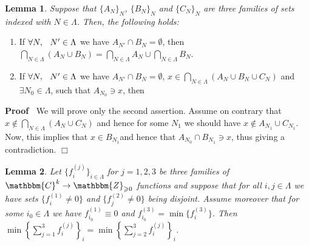 \documentclass{article}
\newcommand{\nin}{\not\in}
\newenvironment{proof}{\noindent\textbf{Proof\ }}{\hspace*{\fill}$\Box$\medskip}
\numberwithin{definition}{section}
\newtheorem{lemma}{Lemma}
\numberwithin{lemma}{section}
\numberwithin{proposition}{section}
{\theorembodyfont{\rmfamily}\newtheorem{remark}{Remark}
\numberwithin{remark}{section}
}
\begin{document}
\begin{lemma}
  \label{P-def:lem-threeset}Suppose that $\{ A_N \}_N$, $\{ B_N \}_N$ and $\{
  C_N \}_N$ are three families of sets indexed with $N \in \Lambda$. Then, the
  following holds:
\end{lemma}
\begin{enumerate}
  \item If $\forall N, \hspace{0.75em} N' \in \Lambda$ we have $A_{N'} \cap
  B_N = \emptyset$, then $\bigcap_{N \in \Lambda} ( A_N \cup B_N) = \bigcap_{N
  \in \Lambda} A_N \cup \bigcap_{N \in \Lambda} B_N$.
  
  \item If $\forall N, \hspace{0.75em} N' \in \Lambda$ we have $A_{N'} \cap
  B_N = \emptyset$, $x \in \bigcap_{N \in \Lambda} ( A_N \cup B_N \cup C_N)$
  and $\exists N_0 \in \Lambda$, such that $A_{N_0} \ni x$, then
\end{enumerate}
\begin{proof}
  We will prove only the second assertion. Assume on contrary that $x \nin
  \bigcap_{N \in \Lambda} ( A_N \cup C_N)$ and hence for some $N_1$ we should
  have $x \nin A_{N_1} \cup C_{N_1}$. Now, this implies that $x \in
  B_{N_1}$and hence that $A_{N_0} \cap B_{N_1} \ni x$, thus giving a
  contradiction.
\end{proof}

\begin{lemma}
  \label{lem-4}Let $\{ f^{( j)}_i \}_{i \in \Lambda}$ for $j = 1, 2, 3$ be
  three families of $\mathbbm{C}^k \rightarrow \mathbbm{Z}_{\geqslant 0}$
  functions and suppose that for all $i, j \in \Lambda$ we have sets $\{ f^{(
  1)}_i \neq 0 \}$ and $\{ f_j^{( 2)} \neq 0 \}$ being disjoint. Assume
  moreover that for some $i_0 \in \Lambda$ we have $f^{( 1)}_{i_0} \equiv 0$
  and $f^{( 3)}_{i_0} = \min \{ f_i^{( 3)} \}$. Then $\min \left\{ \sum_{j =
  1}^3 f^{( j)}_i \right\}_i = \min \left\{ \sum_{j = 2}^3 f_i^{( j)}
  \right\}_i$.
\end{lemma}
\end{document}
